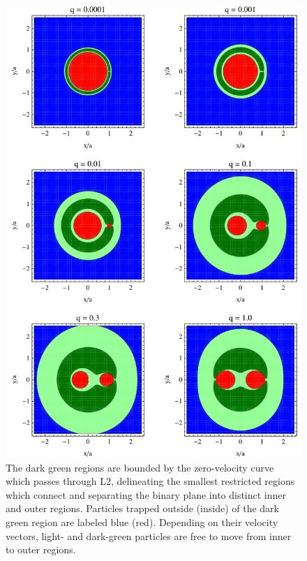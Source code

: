 \documentclass[usenatbib]{mnras}
\begin{document}
\begin{figure}
\begin{center}
\includegraphics[scale=0.56]{Excluded_Regions_q_vVirial_DarkGreen}
\end{center}
\caption{The dark green regions are bounded by the zero-velocity curve
  which passes through L2, delineating the smallest restricted regions
  which connect and separating the binary plane into distinct inner
  and outer regions. Particles trapped outside (inside) of the dark
  green region are labeled blue (red). Depending on their velocity
  vectors, light- and dark-green particles are free to move from inner
  to outer regions. }
\label{Fig:CJAddV}
\end{figure}
\end{document}
